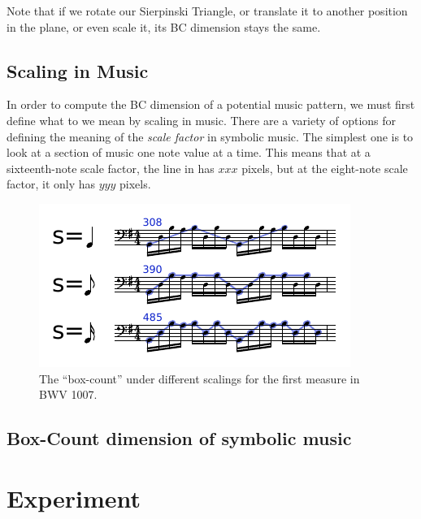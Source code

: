   Note that if we rotate our Sierpinski Triangle, or translate it
to another position in the plane, or even scale it, its BC dimension
stays the same.

\subsection{Scaling in Music} 
In order to compute the BC dimension of
a potential music pattern, we must first define what to we mean by scaling 
in music. There are a variety of options for defining the meaning of
the \emph{scale factor} in symbolic music. The simplest one 
is to look at a section of music one note value at a time.
This means that at a sixteenth-note scale factor, the
line in  has $xxx$ pixels, but
at the eight-note scale factor, it only has $yyy$ pixels.


\begin{figure}
  \includegraphics[width=\linewidth]{src/img/musical-scaling-example.pdf}
  \caption{The ``box-count'' under different scalings for the first measure in BWV 1007.}
  \label{fig:egscalingmusic}
\end{figure}

\subsection{Box-Count dimension of symbolic music}

\section{Experiment}


